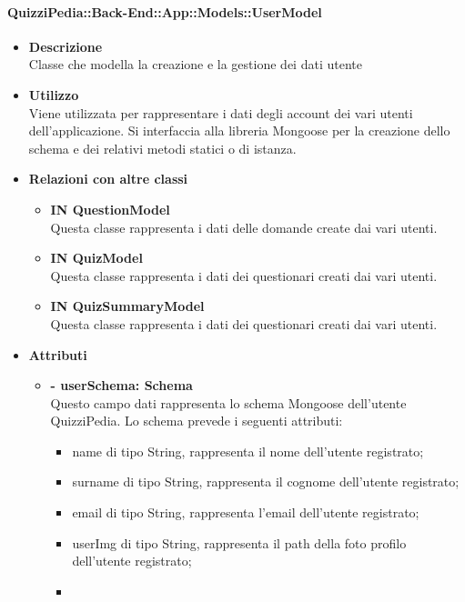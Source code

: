 \paragraph{QuizziPedia::Back-End::App::Models::UserModel}
\begin{itemize}
	\item \textbf{Descrizione} \\
	Classe che modella la creazione e la gestione dei dati utente
	\item \textbf{Utilizzo} \\
	Viene utilizzata per rappresentare i dati degli account dei vari utenti dell’applicazione. Si interfaccia alla libreria Mongoose per la creazione dello schema e dei relativi metodi statici o di istanza.
	\item \textbf{Relazioni con altre classi} \\
		\begin{itemize}
			\item \textbf{IN QuestionModel} \\
			Questa classe rappresenta i dati delle domande create dai vari utenti.
			\item \textbf{IN QuizModel} \\
			Questa classe rappresenta i dati dei questionari creati dai vari utenti.
			\item \textbf{IN QuizSummaryModel} \\
			Questa classe rappresenta i dati dei questionari creati dai vari utenti.
		\end{itemize}
	\item \textbf{Attributi} \\
		\begin{itemize}
			\item \textbf{- userSchema: Schema} \\
			Questo campo dati rappresenta lo schema Mongoose dell'utente QuizziPedia. Lo schema prevede i seguenti attributi:
			\begin{itemize}
				\item 
					name di tipo String, rappresenta il nome  dell'utente registrato;
				\item 
					surname di tipo String, rappresenta il cognome  dell'utente registrato;
				\item 
					email di tipo String, rappresenta l'email  dell'utente registrato;
				\item 
					userImg di tipo String, rappresenta il path della foto profilo dell'utente registrato;
				\item 

\end{itemize}
\end{itemize}
\end{itemize}
